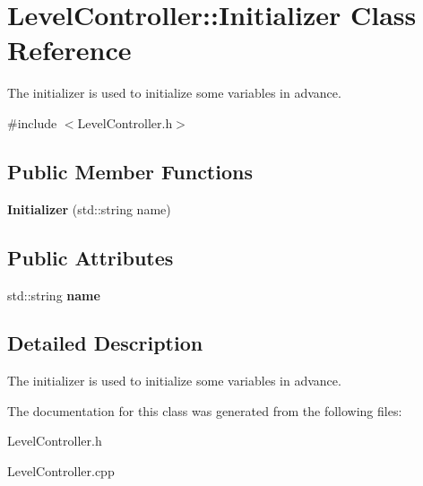 \hypertarget{class_level_controller_1_1_initializer}{\section{Level\+Controller\+:\+:Initializer Class Reference}
\label{class_level_controller_1_1_initializer}
}


The initializer is used to initialize some variables in advance.  




{\ttfamily \#include $<$Level\+Controller.\+h$>$}

\subsection*{Public Member Functions}
\begin{DoxyCompactItemize}
\item 
\hypertarget{class_level_controller_1_1_initializer_a12f38f31c04a35ea21f977883eb6f4d5}{{\bfseries Initializer} (std\+::string name)}\label{class_level_controller_1_1_initializer_a12f38f31c04a35ea21f977883eb6f4d5}

\end{DoxyCompactItemize}
\subsection*{Public Attributes}
\begin{DoxyCompactItemize}
\item 
\hypertarget{class_level_controller_1_1_initializer_ac90a27c67674791807041b13124426c7}{std\+::string {\bfseries name}}\label{class_level_controller_1_1_initializer_ac90a27c67674791807041b13124426c7}

\end{DoxyCompactItemize}


\subsection{Detailed Description}
The initializer is used to initialize some variables in advance. 

The documentation for this class was generated from the following files\+:\begin{DoxyCompactItemize}
\item 
Level\+Controller.\+h\item 
Level\+Controller.\+cpp\end{DoxyCompactItemize}
